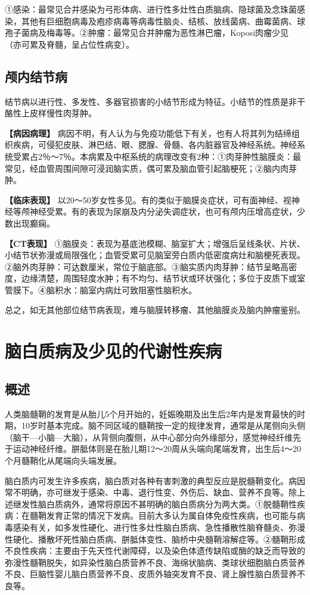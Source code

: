 ①感染：最常见合并感染为弓形体病、进行性多灶性白质脑病、隐球菌及念珠菌感染，其他有巨细胞病毒及疱疹病毒等病毒性脑炎、结核、放线菌病、曲霉菌病、球孢子菌病及梅毒等。②肿瘤：最常见合并肿瘤为恶性淋巴瘤，Koposi肉瘤少见（亦可累及脊髓，呈占位性病变）。

\subsection{颅内结节病}

结节病以进行性、多发性、多器官损害的小结节形成为特征。小结节的性质是非干酪性上皮样慢性肉芽肿。

\textbf{【病因病理】}
病因不明，有人认为与免疫功能低下有关，也有人将其列为结缔组织疾病，可侵犯皮肤、淋巴结、眼、腮腺、骨髓、各内脏器官及神经系统。神经系统受累占2％～7％。本病累及中枢系统的病理改变有2种：①肉芽肿性脑膜炎：最常见，经血管周围间隙可浸润脑实质，偶可累及脑血管引起脑梗死；②脑内肉芽肿。

\textbf{【临床表现】}
以20～50岁女性多见。有的类似于脑膜炎症状，可有面神经、视神经等颅神经受累。有的表现为尿崩及内分泌失调症状，也可有颅内压增高症状，少数出现癫痫。

\textbf{【CT表现】}
①脑膜炎：表现为基底池模糊、脑室扩大；增强后呈线条状、片状、小结节状弥漫或局限强化；血管受累可见脑室旁白质内低密度病灶和脑梗死表现。②脑外肉芽肿：可达数厘米，常位于脑底部。③脑实质内肉芽肿：结节呈略高密度，边缘清楚，周围轻度水肿；有不均匀、结节状或环状强化；多位于皮质下或室管膜下。④脑积水：脑室内病灶可致阻塞性脑积水。

总之，如无其他部位结节病表现，难与脑膜转移瘤、其他脑膜炎及脑内肿瘤鉴别。

\section{脑白质病及少见的代谢性疾病}

\subsection{概述}

人类脑髓鞘的发育是从胎儿5个月开始的，妊娠晚期及出生后2年内是发育最快的时期，10岁时基本完成。脑不同区域的髓鞘按一定的规律发育，通常是从尾侧向头侧（脑干---小脑---大脑），从背侧向腹侧，从中心部分向外缘部分，感觉神经纤维先于运动神经纤维。胼胝体则是在胎儿期12～20周从头端向尾端发育，出生后4～20个月髓鞘化从尾端向头端发展。

脑白质内可发生许多疾病，脑白质对各种有害刺激的典型反应是脱髓鞘变化。病因常不明确，亦可继发于感染、中毒、退行性变、外伤后、缺血、营养不良等。除上述继发性脑白质病外，通常将原因不甚明确的脑白质病分为两大类。①脱髓鞘性疾病：在髓鞘发育正常的情况下发病。目前大多认为属自体免疫性疾病，也可能与病毒感染有关，如多发性硬化、进行性多灶性脑白质病、急性播散性脑脊髓炎、弥漫性硬化、播散坏死性脑白质病、胼胝体变性、脑桥中央髓鞘溶解症等。②髓鞘形成不良性疾病：主要由于先天性代谢障碍，以及染色体遗传缺陷或酶的缺乏而导致的弥漫性髓鞘脱失，如异染性脑白质营养不良、海绵状脑病、类球状细胞脑白质营养不良、巨脑性婴儿脑白质营养不良、皮质外轴突发育不良、肾上腺性脑白质营养不良等。

